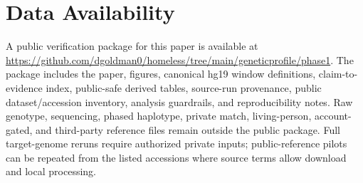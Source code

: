 \documentclass[11pt]{article}
\begin{document}
\section*{Data Availability}

A public verification package for this paper is available at \url{https://github.com/dgoldman0/homeless/tree/main/geneticprofile/phase1}. The package includes the paper, figures, canonical hg19 window definitions, claim-to-evidence index, public-safe derived tables, source-run provenance, public dataset/accession inventory, analysis guardrails, and reproducibility notes. Raw genotype, sequencing, phased haplotype, private match, living-person, account-gated, and third-party reference files remain outside the public package. Full target-genome reruns require authorized private inputs; public-reference pilots can be repeated from the listed accessions where source terms allow download and local processing.
\end{document}
